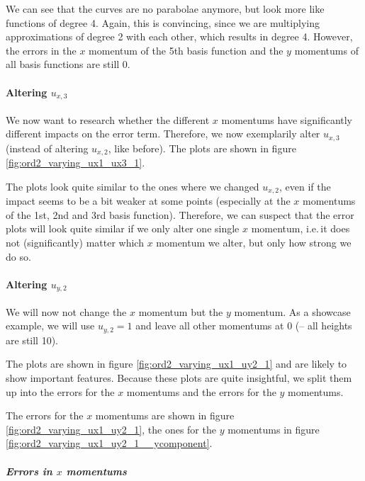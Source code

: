 \documentclass{article}
\begin{document}


We can see that the curves are no parabolae anymore, but look more like functions of degree 4. Again, this is convincing, since we are multiplying approximations of degree 2 with each other, which results in degree 4. However, the errors in the $x$ momentum of the 5th basis function and the $y$ momentums of all basis functions are still 0.

\paragraph{\texorpdfstring{Altering $u_{x,3}$}{Altering ux3}}

We now want to research whether the different $x$ momentums have significantly different impacts on the error term. Therefore, we now exemplarily alter $u_{x,3}$ (instead of altering $u_{x,2}$, like before). The plots are shown in figure \ref{fig:ord2_varying_ux1_ux3_1}.



The plots look quite similar to the ones where we changed $u_{x,2}$, even if the impact seems to be a bit weaker at some points (especially at the $x$ momentums of the 1st, 2nd and 3rd basis function). Therefore, we can suspect that the error plots will look quite similar if we only alter one single $x$ momentum, i.e.\,it does not (significantly) matter which $x$ momentum we alter, but only how strong we do so.

\paragraph{\texorpdfstring{Altering $u_{y,2}$}{Altering uy2}}

We will now not change the $x$ momentum but the $y$ momentum. As a showcase example, we will use $u_{y,2}=1$ and leave all other momentums at 0 (-- all heights are still 10).

The plots are shown in figure \ref{fig:ord2_varying_ux1_uy2_1} and are likely to show important features. Because these plots are quite insightful, we split them up into the errors for the $x$ momentums and the errors for the $y$ momentums.

The errors for the $x$ momentums are shown in figure \ref{fig:ord2_varying_ux1_uy2_1}, the ones for the $y$ momentums in figure \ref{fig:ord2_varying_ux1_uy2_1__ycomponent}.

\subparagraph{\texorpdfstring{Errors in $x$ momentums}{Errors in x momentums}}
\end{document}

